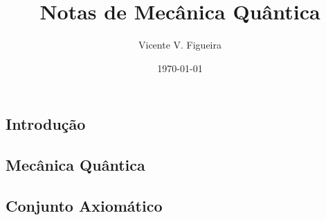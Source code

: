 \documentclass[twoside]{amsart}
\title{
Notas de Mecânica Quântica
}
\author{
  Vicente V. Figueira
       }
\date{\today}
\numberwithin{equation}{section}
\begin{document}
\maketitle

\tableofcontents


\begin{refsection}
\section{Introdução}

\printbibliography[heading=subbibliography]
\end{refsection}


\begin{refsection}
\section{Mecânica Quântica}

\subsection{Conjunto Axiomático}

\printbibliography[heading=subbibliography]
\end{refsection}

\end{document}
